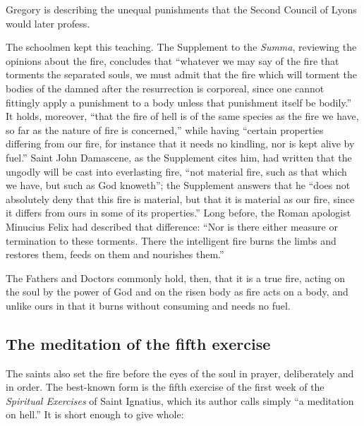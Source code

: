 \noindent Gregory is describing the unequal punishments that the Second Council of Lyons would later profess.

The schoolmen kept this teaching. The Supplement to the \emph{Summa}, reviewing the opinions about the fire, concludes that ``whatever we may say of the fire that torments the separated souls, we must admit that the fire which will torment the bodies of the damned after the resurrection is corporeal, since one cannot fittingly apply a punishment to a body unless that punishment itself be bodily.'' It holds, moreover, ``that the fire of hell is of the same species as the fire we have, so far as the nature of fire is concerned,'' while having ``certain properties differing from our fire, for instance that it needs no kindling, nor is kept alive by fuel.'' Saint John Damascene, as the Supplement cites him, had written that the ungodly will be cast into everlasting fire, ``not material fire, such as that which we have, but such as God knoweth''; the Supplement answers that he ``does not absolutely deny that this fire is material, but that it is material as our fire, since it differs from ours in some of its properties.'' Long before, the Roman apologist Minucius Felix had described that difference: ``Nor is there either measure or termination to these torments. There the intelligent fire burns the limbs and restores them, feeds on them and nourishes them.''

The Fathers and Doctors commonly hold, then, that it is a true fire, acting on the soul by the power of God and on the risen body as fire acts on a body, and unlike ours in that it burns without consuming and needs no fuel.

\subsection{The meditation of the fifth exercise}

The saints also set the fire before the eyes of the soul in prayer, deliberately and in order. The best-known form is the fifth exercise of the first week of the \emph{Spiritual Exercises} of Saint Ignatius, which its author calls simply ``a meditation on hell.'' It is short enough to give whole:

